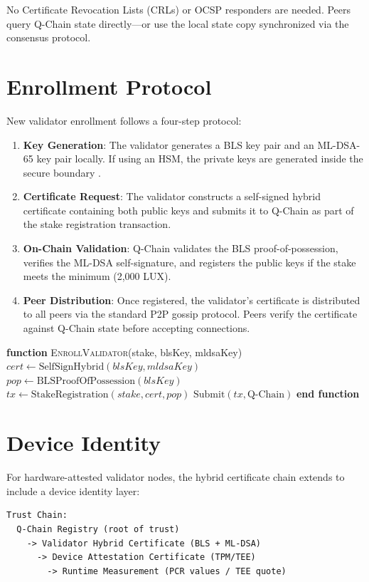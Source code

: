\documentclass[11pt]{article}
\begin{document}
No Certificate Revocation Lists (CRLs) or OCSP responders are needed. Peers query Q-Chain state directly---or use the local state copy synchronized via the consensus protocol.

\section{Enrollment Protocol}

New validator enrollment follows a four-step protocol:

\begin{enumerate}
\item \textbf{Key Generation}: The validator generates a BLS key pair and an ML-DSA-65 key pair locally. If using an HSM, the private keys are generated inside the secure boundary \cite{hsm-boundary}.
\item \textbf{Certificate Request}: The validator constructs a self-signed hybrid certificate containing both public keys and submits it to Q-Chain as part of the stake registration transaction.
\item \textbf{On-Chain Validation}: Q-Chain validates the BLS proof-of-possession, verifies the ML-DSA self-signature, and registers the public keys if the stake meets the minimum (2,000 LUX).
\item \textbf{Peer Distribution}: Once registered, the validator's certificate is distributed to all peers via the standard P2P gossip protocol. Peers verify the certificate against Q-Chain state before accepting connections.
\end{enumerate}

\begin{algorithmic}[1]
\State \textbf{function} \textsc{EnrollValidator}(stake, blsKey, mldsaKey)
\State $cert \gets \text{SelfSignHybrid}(blsKey, mldsaKey)$
\State $pop \gets \text{BLSProofOfPossession}(blsKey)$
\State $tx \gets \text{StakeRegistration}(stake, cert, pop)$
\State $\text{Submit}(tx, \text{Q-Chain})$
\State \textbf{end function}
\end{algorithmic}

\section{Device Identity}

For hardware-attested validator nodes, the hybrid certificate chain extends to include a device identity layer:

\begin{verbatim}
Trust Chain:
  Q-Chain Registry (root of trust)
    -> Validator Hybrid Certificate (BLS + ML-DSA)
      -> Device Attestation Certificate (TPM/TEE)
        -> Runtime Measurement (PCR values / TEE quote)
\end{verbatim}
\end{document}
